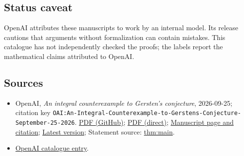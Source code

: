 \documentclass[11pt]{article}
\begin{document}
\subsection{Status caveat}
OpenAI attributes these manuscripts to work by an internal model. Its release cautions that arguments without formalization can contain mistakes. This catalogue has not independently checked the proofs; the labels report the mathematical claims attributed to OpenAI.

\subsection{Sources}
\begin{itemize}
\item OpenAI, \emph{An integral counterexample to Gersten's conjecture}, 2026-09-25; citation key \texttt{OAI:An-Integral-Counterexample-to-Gerstens-Conjecture-September-25-2026}. \href{https://github.com/openai/math/blob/adc7f1241b42e322a6451854ab7e4b4c146bf78a/preprints/An-Integral-Counterexample-to-Gerstens-Conjecture-September-25-2026/An-Integral-Counterexample-to-Gerstens-Conjecture-September-25-2026.pdf}{PDF (GitHub)}; \href{https://github.com/openai/math/raw/adc7f1241b42e322a6451854ab7e4b4c146bf78a/preprints/An-Integral-Counterexample-to-Gerstens-Conjecture-September-25-2026/An-Integral-Counterexample-to-Gerstens-Conjecture-September-25-2026.pdf}{PDF (direct)}; \href{https://github.com/openai/math/blob/adc7f1241b42e322a6451854ab7e4b4c146bf78a/preprints/An-Integral-Counterexample-to-Gerstens-Conjecture-September-25-2026/README.md}{Manuscript page and citation}; \href{https://github.com/openai/math/blob/main/preprints/An-Integral-Counterexample-to-Gerstens-Conjecture-September-25-2026/An-Integral-Counterexample-to-Gerstens-Conjecture-September-25-2026.pdf}{Latest version}; Statement source: \href{https://github.com/openai/math/blob/adc7f1241b42e322a6451854ab7e4b4c146bf78a/preprints/An-Integral-Counterexample-to-Gerstens-Conjecture-September-25-2026/build/source/sections/introduction.tex\#L18}{thm:main}.
\item \href{https://github.com/openai/math/blob/adc7f1241b42e322a6451854ab7e4b4c146bf78a/CONTENTS.md}{OpenAI catalogue entry}.
\end{itemize}
\end{document}
